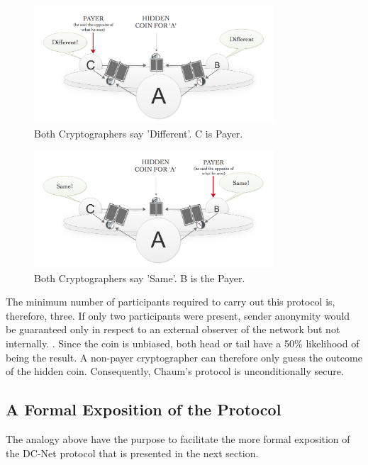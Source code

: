 \begin{enumerate}
\begin{enumerate}
        \begin{figure}[h!]
            \centering
            \includegraphics[width=0.80\textwidth]{Images/AdifferentCaseDifferent.png}
            \caption{Both Cryptographers say 'Different'. C is Payer.}
            \label{fig:AdifferentCaseDifferent}
        \end{figure}
        \begin{figure}[h!]
            \centering
            \includegraphics[width=0.80\textwidth]{Images/AdifferentCaseSame.png}
            \caption{Both Cryptographers say 'Same'. B is the Payer.}
            \label{fig:AdifferentCaseSame}
        \end{figure}
    \end{enumerate}
\end{enumerate}


The minimum number of participants required to carry out this protocol is, therefore, three. If only two participants were present, sender anonymity would be guaranteed only in respect to an external observer of the network but not internally. \newline. Since the coin is unbiased, both head or tail have a 50{\%} likelihood of being the result. A non-payer cryptographer can therefore only guess the outcome of the hidden coin. Consequently, Chaum's protocol is unconditionally secure. \label{sec:internalExternalAnon}




\subsection{A Formal Exposition of the Protocol}
The analogy above have the purpose to facilitate the more formal exposition of the DC-Net protocol that is presented in the next section.

